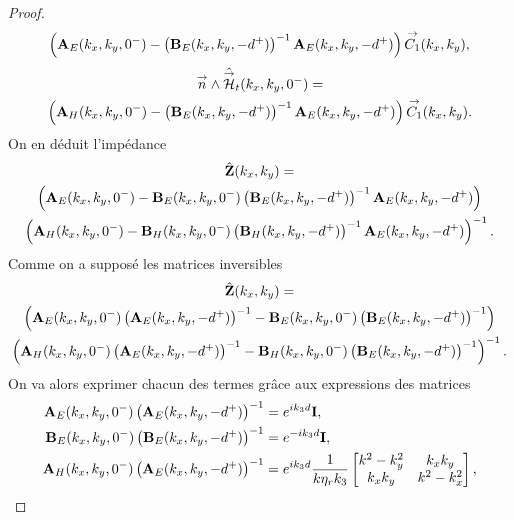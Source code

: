 \begin{proof}
\begin{multline*}
                \left(\mathbf{A}_E(k_x,k_y,0^-)-\left(\mathbf{B}_E(k_x,k_y,-d^+)\right)^{-1}\mathbf{A}_E(k_x,k_y,-d^+)\right){\overset{\rightarrow}{C_1}}(k_x,k_y),
            \end{multline*}
            \begin{multline*}
                {\overset{\rightarrow}{n}} \wedge \hat {{\overset{\rightarrow}{\mathcal{H}}}}_t(k_x,k_y,0^-) =
                \\
                \left(\mathbf{A}_H(k_x,k_y,0^-)-\left(\mathbf{B}_E(k_x,k_y,-d^+)\right)^{-1}\mathbf{A}_E(k_x,k_y,-d^+)\right){\overset{\rightarrow}{C_1}}(k_x,k_y).
            \end{multline*}
            On en déduit l'impédance
            \begin{multline*}
                \hat {\mathbf{Z}}(k_x,k_y) =
                \\
                \left(\mathbf{A}_E(k_x,k_y,0^-)-\mathbf{B}_E(k_x,k_y,0^-)\left(\mathbf{B}_E(k_x,k_y,-d^+)\right)^{-1}\mathbf{A}_E(k_x,k_y,-d^+)\right)
                \\
                \left(\mathbf{A}_H(k_x,k_y,0^-)-\mathbf{B}_H(k_x,k_y,0^-)\left(\mathbf{B}_H(k_x,k_y,-d^+)\right)^{-1}\mathbf{A}_E(k_x,k_y,-d^+)\right)^{-1}.
            \end{multline*}
            Comme on a supposé les matrices inversibles
            \begin{multline*}
                \hat {\mathbf{Z}}(k_x,k_y) =
                \\ \left(\mathbf{A}_E(k_x,k_y,0^-)\left(\mathbf{A}_E(k_x,k_y,-d^+)\right)^{-1}-\mathbf{B}_E(k_x,k_y,0^-)\left(\mathbf{B}_E(k_x,k_y,-d^+)\right)^{-1}\right) 
                \\
                \left(\mathbf{A}_H(k_x,k_y,0^-)\left(\mathbf{A}_E(k_x,k_y,-d^+)\right)^{-1}-\mathbf{B}_H(k_x,k_y,0^-)\left(\mathbf{B}_E(k_x,k_y,-d^+)\right)^{-1}\right)^{-1}.
            \end{multline*}
            On va alors exprimer chacun des termes grâce aux expressions des matrices
            \begin{align*}
                \mA_E(k_x,k_y,0^-)\left(\mA_E(k_x,k_y,-d^+)\right)^{-1} &= e^{ik_3d}\mI,
                \\
                \mB_E(k_x,k_y,0^-)\left(\mB_E(k_x,k_y,-d^+)\right)^{-1} &= e^{-ik_3d}\mI,
                \\
                \mA_H(k_x,k_y,0^-)\left(\mA_E(k_x,k_y,-d^+)\right)^{-1} &= e^{ik_3d}\frac{1}{k\eta_r k_3}
                \begin{bmatrix}
                    k^2 - k_y^2 & k_x k_y
                    \\
                    k_x k _y & k^2 - k_x^2
                \end{bmatrix},

\end{align*}
\end{proof}
